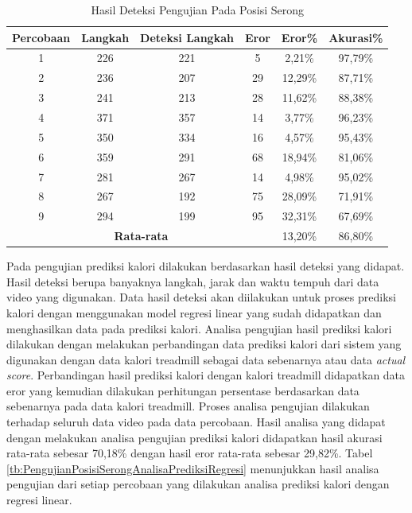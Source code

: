 \begin{longtable}{|c|c|c|c|c|c|}
  \caption{Hasil Deteksi Pengujian Pada Posisi Serong}
  \label{tb:PengujianPosisiSerongAnalisaDeteksi}                                   \\
  \hline
  \rowcolor[HTML]{C0C0C0}
  \textbf{Percobaan} & \textbf{Langkah} & \textbf{Deteksi Langkah} & \textbf{Eror} & \textbf{Eror\%} & \textbf{Akurasi\%} \\
  \hline
  1   & 226   & 221  & 5   & 2,21\%    & 97,79\%   \\
  \hline
  2   & 236   & 207  & 29  & 12,29\%   & 87,71\%   \\
  \hline
  3   & 241   & 213  & 28  & 11,62\%   & 88,38\%   \\
  \hline
  4   & 371   & 357  & 14  & 3,77\%    & 96,23\%   \\
  \hline
  5   & 350   & 334  & 16  & 4,57\%    & 95,43\%   \\
  \hline
  6   & 359   & 291  & 68  & 18,94\%   & 81,06\%   \\
  \hline
  7   & 281   & 267  & 14  & 4,98\%    & 95,02\%   \\
  \hline
  8   & 267   & 192  & 75  & 28,09\%   & 71,91\%   \\
  \hline
  9   & 294   & 199  & 95  & 32,31\%   & 67,69\%   \\
  \hline

  \multicolumn{4}{|c|}{\textbf{Rata-rata}} & 13,20\% & 86,80\% \\
  \hline
\end{longtable}

Pada pengujian prediksi kalori dilakukan berdasarkan hasil deteksi yang didapat. Hasil deteksi berupa banyaknya langkah, jarak dan waktu tempuh dari data video yang digunakan. Data hasil deteksi akan diilakukan untuk proses prediksi kalori dengan menggunakan model regresi linear yang sudah didapatkan dan menghasilkan data pada prediksi kalori. Analisa pengujian hasil prediksi kalori dilakukan dengan melakukan perbandingan data prediksi kalori dari sistem yang digunakan dengan data kalori treadmill sebagai data sebenarnya atau data \emph{actual score}. Perbandingan hasil prediksi kalori dengan kalori treadmill didapatkan data eror yang kemudian dilakukan perhitungan persentase berdasarkan data sebenarnya pada data kalori treadmill. Proses analisa pengujian dilakukan terhadap seluruh data video pada data percobaan. Hasil analisa yang didapat dengan melakukan analisa pengujian prediksi kalori didapatkan hasil akurasi rata-rata sebesar 70,18\% dengan hasil eror rata-rata sebesar 29,82\%. Tabel \ref{tb:PengujianPosisiSerongAnalisaPrediksiRegresi} menunjukkan hasil analisa pengujian dari setiap percobaan yang dilakukan analisa prediksi kalori dengan regresi linear.

